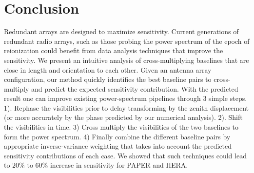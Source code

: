 \documentclass[twocolumn,apj,numberedappendix]{emulateapj}
\renewcommand\[{\begin{equation}}
\renewcommand\]{\end{equation}}
\begin{document}












\section{Conclusion}
Redundant arrays are designed to maximize sensitivity. Current generations of redundant radio arrays, such as those probing the power spectrum of the epoch of reionization could benefit from data analysis techniques that improve the sensitivity. We present an intuitive analysis of cross-multiplying baselines that are close in length and orientation to each other. Given an antenna array configuration, our method quickly identifies the best baseline pairs to cross-multiply and predict the expected sensitivity contribution. With the predicted result one can improve existing power-spectrum pipelines through 3 simple steps. 1). Rephase the visibilities prior to delay transforming by the zenith displacement (or more accurately by the phase predicted by our numerical analysis). 2). Shift the visibilities in time. 3) Cross multiply the visibilities of the two baselines  to form the power spectrum. 4) Finally combine the different baseline pairs by appropriate inverse-variance weighting that takes into account the predicted sensitivity contributions of each case. We showed that such techniques could lead to $20\%$ to $60\%$ increase in sensitivity for PAPER and HERA. 
\end{document}
